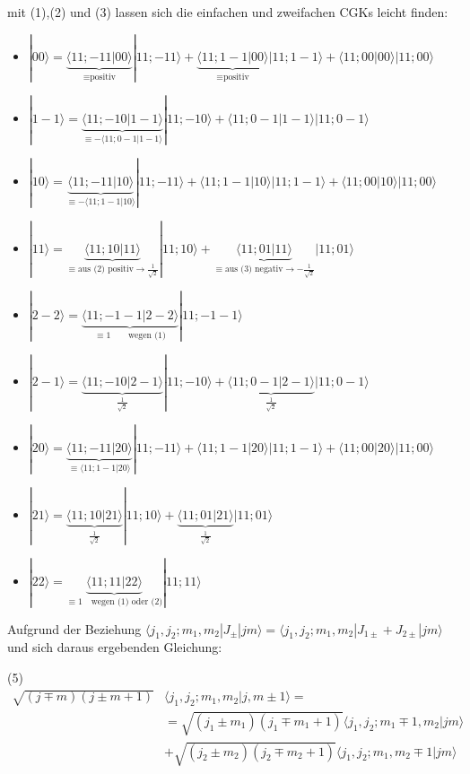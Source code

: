 mit (1),(2) und (3) lassen sich die einfachen und zweifachen CGKs leicht finden:

\begin{itemize}
\item \(|00\rangle = \underbrace{\langle 11;-11|00\rangle}_{\equiv \text{positiv}}|11;-11\rangle + \underbrace{\langle 11;1-1|00\rangle}_{\equiv \text{positiv}}|11;1-1\rangle + \langle 11;00|00\rangle|11;00\rangle\)
\item \(|1-1\rangle =\underbrace{\langle 11;-10|1-1\rangle}_{\equiv -\langle 11;0-1 |1-1\rangle}| 11;-10\rangle +\langle 11;0-1 |1-1\rangle |11;0-1 \rangle\)
\item \(|10\rangle = \underbrace{\langle 11;-11|10\rangle}_{\equiv -\langle 11;1-1|10\rangle}|11;-11\rangle +  \langle 11;1-1|10\rangle| 11;1-1\rangle+ \langle 11;00|10\rangle|11;00\rangle\)
\item \(|11\rangle = \underbrace{\langle 11;10 |11\rangle}_{\equiv \text{aus (2) positiv} \rightarrow\frac{1}{\sqrt 2}} |11;10\rangle + \underbrace{\langle 11;01 |11\rangle}_{\equiv \text{aus (3) negativ} \rightarrow -\frac{1}{\sqrt 2}} |11;01\rangle\)
\item \(|2-2\rangle =\underbrace{ \langle 11;-1-1|2-2\rangle}_{\equiv 1\qquad \text{wegen (1)}}|11;-1-1\rangle\)
\item \(|2 -1\rangle = \underbrace{\langle 11;-1 0|2-1\rangle}_{\frac{1}{\sqrt 2}} |11;-1 0\rangle + \underbrace{\langle 11;0-1|2-1\rangle}_{\frac{1}{\sqrt 2}} |11;0-1\rangle\)
\item \(|2 0\rangle = \underbrace{\langle 11;-1 1 |20\rangle}_{\equiv \langle11; 1-1 |20\rangle}|11;-1 1\rangle+\langle11; 1-1 |20\rangle|11;1-1\rangle+\langle 11;00 |20\rangle|11;00\rangle\)
\item \(|21\rangle = \underbrace{\langle 11;10|21\rangle}_{\frac{1}{\sqrt 2}} |11;10\rangle+\underbrace{\langle 11; 01 |21\rangle}_{\frac{1}{\sqrt 2}}|11;01\rangle\)
\item \(|22\rangle = \underbrace{\langle 11;11|22\rangle}_{\equiv 1\quad \text{wegen (1) oder (2)}}|11;11\rangle\)
\end{itemize}


Aufgrund der Beziehung \(\langle j_1,j_2;m_1,m_2|J_{\pm}|jm\rangle=\langle j_1,j_2;m_1,m_2|J_{1\pm}+J_{2\pm}|jm\rangle\) und sich daraus ergebenden Gleichung:

(5)
\begin{align}
\sqrt{(j\mp m)(j\pm m+1)}&\langle j_1,j_2; m_1,m_2 | j,m\pm 1\rangle =\\
&=\sqrt{(j_1\pm m_1)(j_1\mp m_1 +1)}\langle j_1,j_2; m_1 \mp 1,m_2|jm\rangle \\
&+ \sqrt{(j_2\pm m_2)(j_2\mp m_2 +1)}\langle j_1,j_2; m_1 ,m_2 \mp 1|jm\rangle
\end{align}


